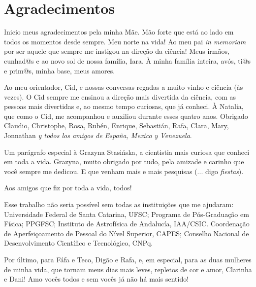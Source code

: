 


\chapter*{Agradecimentos}

Inicio meus agradecimentos pela minha Mãe. Mão forte que está ao lado em todos os momentos desde sempre. Meu norte na vida! Ao meu pai {\em in memoriam} por ser aquele que sempre me instigou na direção da ciência! Meus irmãos, cunhad@s e ao novo sol de nossa família, Iara. À minha família inteira, avós, ti@s e prim@s, minha base, meus amores.

Ao meu orientador, Cid, e nossas conversas regadas a muito vinho e ciência (às vezes). O Cid sempre me ensinou a direção mais divertida da ciência, com as pessoas mais divertidas e, ao mesmo tempo curiosas, que já conheci. À Natalia, que como o Cid, me acompanhou e auxiliou durante esses quatro anos. Obrigado Claudio, Christophe, Rosa, Rubén, Enrique, Sebastián, Rafa, Clara, Mary, Jonnathan {\em y todos los amigos de España, Mexico y Venezuela}.

Um parágrafo especial à Grazyna Stasi{\' n}ska, a cientistia mais curiosa que conheci em toda a vida. Grazyna, muito obrigado por tudo, pela amizade e carinho que você sempre me dedicou. E que venham mais e mais pesquisas (... digo {\em fiestas}).

Aos amigos que fiz por toda a vida, todos!

Esse trabalho não seria possível sem todas as instituições que me ajudaram: Universidade Federal de Santa Catarina, UFSC; Programa de Pós-Graduação em Física; PPGFSC; Instituto de Astrofísica de Andalucía, IAA/CSIC. Coordenação de Aperfeiçoamento de Pessoal do Nível Superior, CAPES; Conselho Nacional de Desenvolvimento Científico e Tecnológico, CNPq.

Por último, para Fáfa e Teco, Digão e Rafa, e, em especial, para as duas mulheres de minha vida, que tornam meus dias mais leves, repletos de cor e amor, Clarinha e Dani! Amo vocês todos e sem vocês já não há mais sentido!

